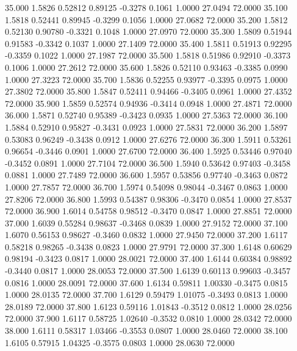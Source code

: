   35.000   1.5826   0.52812   0.89125  -0.3278   0.1061   1.0000  27.0494  72.0000
  35.100   1.5818   0.52441   0.89945  -0.3299   0.1056   1.0000  27.0682  72.0000
  35.200   1.5812   0.52130   0.90780  -0.3321   0.1048   1.0000  27.0970  72.0000
  35.300   1.5809   0.51944   0.91583  -0.3342   0.1037   1.0000  27.1409  72.0000
  35.400   1.5811   0.51913   0.92295  -0.3359   0.1022   1.0000  27.1987  72.0000
  35.500   1.5818   0.51986   0.92910  -0.3373   0.1006   1.0000  27.2612  72.0000
  35.600   1.5826   0.52110   0.93463  -0.3385   0.0990   1.0000  27.3223  72.0000
  35.700   1.5836   0.52255   0.93977  -0.3395   0.0975   1.0000  27.3802  72.0000
  35.800   1.5847   0.52411   0.94466  -0.3405   0.0961   1.0000  27.4352  72.0000
  35.900   1.5859   0.52574   0.94936  -0.3414   0.0948   1.0000  27.4871  72.0000
  36.000   1.5871   0.52740   0.95389  -0.3423   0.0935   1.0000  27.5363  72.0000
  36.100   1.5884   0.52910   0.95827  -0.3431   0.0923   1.0000  27.5831  72.0000
  36.200   1.5897   0.53083   0.96249  -0.3438   0.0912   1.0000  27.6276  72.0000
  36.300   1.5911   0.53261   0.96654  -0.3446   0.0901   1.0000  27.6700  72.0000
  36.400   1.5925   0.53446   0.97040  -0.3452   0.0891   1.0000  27.7104  72.0000
  36.500   1.5940   0.53642   0.97403  -0.3458   0.0881   1.0000  27.7489  72.0000
  36.600   1.5957   0.53856   0.97740  -0.3463   0.0872   1.0000  27.7857  72.0000
  36.700   1.5974   0.54098   0.98044  -0.3467   0.0863   1.0000  27.8206  72.0000
  36.800   1.5993   0.54387   0.98306  -0.3470   0.0854   1.0000  27.8537  72.0000
  36.900   1.6014   0.54758   0.98512  -0.3470   0.0847   1.0000  27.8851  72.0000
  37.000   1.6039   0.55284   0.98637  -0.3468   0.0839   1.0000  27.9152  72.0000
  37.100   1.6070   0.56153   0.98627  -0.3460   0.0832   1.0000  27.9450  72.0000
  37.200   1.6117   0.58218   0.98265  -0.3438   0.0823   1.0000  27.9791  72.0000
  37.300   1.6148   0.60629   0.98194  -0.3423   0.0817   1.0000  28.0021  72.0000
  37.400   1.6144   0.60384   0.98892  -0.3440   0.0817   1.0000  28.0053  72.0000
  37.500   1.6139   0.60113   0.99603  -0.3457   0.0816   1.0000  28.0091  72.0000
  37.600   1.6134   0.59811   1.00330  -0.3475   0.0815   1.0000  28.0135  72.0000
  37.700   1.6129   0.59479   1.01075  -0.3493   0.0813   1.0000  28.0189  72.0000
  37.800   1.6123   0.59116   1.01843  -0.3512   0.0812   1.0000  28.0256  72.0000
  37.900   1.6117   0.58725   1.02640  -0.3532   0.0810   1.0000  28.0342  72.0000
  38.000   1.6111   0.58317   1.03466  -0.3553   0.0807   1.0000  28.0460  72.0000
  38.100   1.6105   0.57915   1.04325  -0.3575   0.0803   1.0000  28.0630  72.0000
